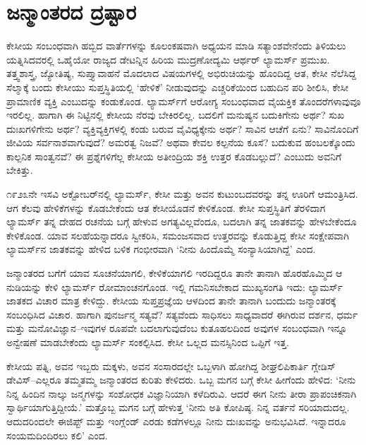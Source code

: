 \section{ಜನ್ಮಾಂತರದ ದ್ರಷ್ಟಾರ}

ಕೇಸೀಯ ಸಂಬಂಧವಾಗಿ ಹಬ್ಬಿದ ವಾರ್ತೆಗಳನ್ನು ಕೂಲಂಕಷವಾಗಿ ಅಧ್ಯಯನ ಮಾಡಿ ಸತ್ಯಾಂಶವೇನೆಂದು ತಿಳಿಯಲು ಯತ್ನಿಸಿದವರಲ್ಲಿ ಒಹೈಯೋ ರಾಜ್ಯದ ಡೇಟನ್ನಿನ ಹಿರಿಯ ಮುದ್ರಣೋದ್ಯಮಿ ಆರ್ಥರ್ ಲ್ಯಾಮರ್ಸ್ ಪ್ರಮುಖ. ತತ್ತ್ವಶಾಸ್ತ್ರ, ಜ್ಯೋತಿಷ್ಯ, ಸುಪ್ತ್ಯಾವಾಹನೆ ಮೊದಲಾದ ವಿಷಯಗಳಲ್ಲಿ ಅಭಿರುಚಿಯನ್ನು ಹೊಂದಿದ್ದ ಆತ, ಕೇಸೀ ನೆಲೆಸಿದ್ದ ಸೆಲ್ಮಾಕ್ಕೆ ಬಂದು ಕೇಸೀಯು ಸುಪ್ತಸ್ಥಿತಿಯಲ್ಲಿ ‘ಹೇಳಿಕೆ’ ನೀಡುವುದನ್ನು ಎಚ್ಚರಿಕೆಯಿಂದ ಬಹುದಿನ ಪರಿ ಶೀಲಿಸಿ, ಕೇಸೀ ಪ್ರಾಮಾಣಿಕ ವ್ಯಕ್ತಿ ಎಂಬುದನ್ನು ಕಂಡುಕೊಂಡ. ಲ್ಯಾಮರ್ಸ್​ಗೆ ಆರೋಗ್ಯ ಸಂಬಂಧವಾದ ವೈಯಕ್ತಿಕ ತೊಂದರೆಗಳಾವುವೂ ಇರಲಿಲ್ಲ. ಹಾಗಾಗಿ ಈ ನಿಟ್ಟಿನಲ್ಲಿ ಕೇಸೀಯ ನೆರವು ಬೇಕಿರಲಿಲ್ಲ. ಬದಲಿಗೆ ಮನುಷ್ಯನ ಬದುಕಿಗೇನು ಅರ್ಥ? ಸುಖ ದುಃಖಗಳಿಗೇನು ಅರ್ಥ? ವ್ಯಕ್ತಿವ್ಯಕ್ತಿಗಳಲ್ಲಿ ಕಂಡು ಬರುವ ವೈವಿಧ್ಯಕ್ಕೇನು ಅರ್ಥ? ಸಾವಿನ ಆಚೆಗೆ ಏನು? ಸಾವಿನೊಂದಿಗೆ ಜೀವಿಯ ಸರ್ವನಾಶವಾಗುವುದೆ? ಅಮರತ್ವ ನಿಜವೆ? ಅಥವಾ ಕೇವಲ ಕಲ್ಪನೆಯ ಕೂಸೆ? ಬದುಕುವ ಹಂಬಲಕ್ಕೊಂದು ಕಾಲ್ಪನಿಕ ಸಾಂತ್ವನವೆ? ಈ ಪ್ರಶ್ನೆಗಳಿಗೆಲ್ಲ ಕೇಸೀಯ ಅತೀಂದ್ರಿಯ ಶಕ್ತಿ ಉತ್ತರ ಕೊಡಬಲ್ಲುದೆ? ಎಂಬುದು ಅವನಿಗೆ ಬೇಕಿತ್ತು.

೧೯೨೩ನೇ ಇಸವಿ ಅಕ್ಟೋಬರ್​ನಲ್ಲಿ ಲ್ಯಾಮರ್ಸ್, ಕೇಸೀ ಮತ್ತು ಅವನ ಕುಟುಂಬದವರನ್ನು ತನ್ನ ಊರಿಗೆ ಆಮಂತ್ರಿಸಿದ. ಆಗ ಕೆಲವು ಹೇಳಿಕೆಗಳನ್ನು ಕೊಡಬೇಕೆಂದು ಆತ ಕೇಸೀಯೊಡನೆ ಕೇಳಿಕೊಂಡ. ಕೇಸೀ ಸುಪ್ತಸ್ಥಿತಿಗೆ ತೆರಳಿದಾಗ ಲ್ಯಾಮರ್ಸ್ ತನ್ನ ದೇಹದ ರಚನೆಯ ಬಗ್ಗೆ ಹೇಳುವ ಅಗತ್ಯವಿಲ್ಲವೆಂದೂ, ಬದಲಾಗಿ ತನ್ನ ಜಾತಕವನ್ನು ಹೇಳಬೇಕೆಂದೂ ಕೇಳಿಕೊಂಡ. ಯಾವ ಸಲಹೆಯನ್ನಾದರೂ ಸ್ವೀಕರಿಸಿ, ಸಮಂಜಸವಾದ ಉತ್ತರವನ್ನು ಕೊಡುತ್ತಿದ್ದ ಕೇಸೀ ಸಂಕ್ಷೇಪವಾಗಿ ಲ್ಯಾಮರ್ಸ್​ನ ಜಾತಕವನ್ನು ಹೇಳಿದ ಬಳಿಕ ಗಂಭೀರವಾಗಿ ‘ನೀನು ಹಿಂದೊಮ್ಮೆ ಸಂನ್ಯಾಸಿಯಾಗಿದ್ದೆ’ ಎಂದ.

ಜನ್ಮಾಂತರದ ಬಗೆಗೆ ಯಾವ ಸೂಚನೆಯಾಗಲಿ, ಕೇಳಿಕೆಯಾಗಲಿ ಇರದಿದ್ದರೂ ತಾನೇ ತಾನಾಗಿ ಹೊರಹೊಮ್ಮಿದ ಆ ನುಡಿಯನ್ನು ಕೇಳಿ ಲ್ಯಾಮರ್ಸ್ ರೋಮಾಂಚನಗೊಂಡ. ಇಲ್ಲಿ ಗಮನಿಸಬೇಕಾದ ಮುಖ್ಯಸಂಗತಿ ಇದು: ಲ್ಯಾಮರ್ಸ್ ಜಾತಕದ ವಿಚಾರ ಮಾತ್ರ ಕೇಳಿದ್ದು. ಕೇಸೀಯ ಸುಪ್ತಪ್ರಜ್ಞೆಯ ಆಳದಿಂದ ತಾನೇ ತಾನಾಗಿ ಬಂದುದು ಜನ್ಮಾಂತರಕ್ಕೆ ಸಂಬಂಧಿಸಿದ ವಿಚಾರ. ಹಾಗಾಗಿ ಪುನರ್ಜನ್ಮ ಸತ್ಯವೆ? ಸತ್ಯವೆಂದು ಸಾಧಿಸಲು ಸಾಧ್ಯವಾದರೆ ಈಗಿರುವ ದರ್ಶನ, ಧರ್ಮ ಮತ್ತು ಮನೋವಿಜ್ಞಾನ–ಇವುಗಳ ರೂಪವೇ ಬದಲಾಗುವುದೆಂಬ ಕುತೂಹಲದಿಂದ ಅವುಗಳ ಸಂಬಂಧವಾಗಿ ಇನ್ನೂ ಅನ್ವೇಷಣೆ ಮಾಡಬೇಕೆಂದು ಲ್ಯಾಮರ್ಸ್ ಸಂಕಲ್ಪಿಸಿದ. ಕೇಸೀ ಒಲ್ಲದ ಮನಸ್ಸಿನಿಂದ ಒಪ್ಪಿಗೆ ಇತ್ತ.

ಕೇಸೀಯ ಪತ್ನಿ, ಅವನ ಇಬ್ಬರು ಮಕ್ಕಳು, ಅವನ ಸಂಸಾರದಲ್ಲೇ ಒಬ್ಬಳಾಗಿ ಹೋಗಿದ್ದ ಶೀಘ್ರಲಿಪಿಕಾರ್ತಿ ಗ್ಲೇಡಿಸ್ ಡೇವಿಸ್​–ಎಲ್ಲರೂ ತಮ್ಮತಮ್ಮ ಜನ್ಮಾಂತರದ ಕುರಿತು ಕೇಳಿದರು. ಒಬ್ಬ ಮಗನ ಬಗ್ಗೆ ಕೇಸೀ ಹೀಗೆಂದು ಹೇಳಿದ: ‘ನೀನು ನಿನ್ನ ಹಿಂದಿನ ನಾಲ್ಕು ಜನ್ಮಗಳನ್ನು ಸಂಶೋಧಕ ವಿಜ್ಞಾನಿಯಾಗಿ ಕಳೆದಿರುವಿ. ಆದರೆ ಈಗ ನೀನು ತೀರಾ ಪ್ರಾಪಂಚಿಕನಾಗಿ ಸ್ವಾರ್ಥಿಯಾಗುತ್ತಿದ್ದೀಯೆ.’ ಮತ್ತೊಬ್ಬ ಮಗನ ಬಗ್ಗೆ ಹೇಳುತ್ತ ‘ನೀನು ಅತಿ ಕೋಪಿಷ್ಠ. ನಿನ್ನ ವರ್ತನೆ ಸರಿಯಾದುದಲ್ಲ. ಆದುದರಿಂದಲೇ ಈಜಿಪ್ಟ್ ಮತ್ತು ಇಂಗ್ಲೆಂಡ್ ಎರಡು ಕಡೆಗಳಲ್ಲೂ ನೀನು ದುಃಖವನ್ನು ಅನುಭವಿಸಿದೆ. ಇನ್ನಾದರೂ ಸಂಯಮದಿಂದಿರಲು ಕಲಿ’ ಎಂದ.



